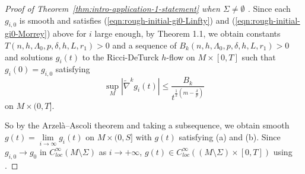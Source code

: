 \documentclass[12pt]{amsart}
\newcommand{\hdel}{\tilde{\nabla}}
\theoremstyle{remark}
\numberwithin{equation}{section}
\begin{document}
\begin{proof}[Proof of Theorem~\ref{thm:intro-application-1-statement} when $\Sigma\neq \emptyset$ ]
    Since each $g_{i,0}$ is smooth and satisfies (\ref{eqn:rough-initial-gi0-Linfty}) and (\ref{eqn:rough-initial-gi0-Morrey}) above for $i$ large enough, by Theorem 1.1, we obtain constants $T(n,h,\Lambda_0,p,\delta,h,L,r_1) > 0$ and a sequence of $B_k(n,h,\Lambda_0,p,\delta,h,L,r_1) > 0$ and solutions $g_i(t)$ to the Ricci-DeTurck $h$-flow on $M \times [0,T]$ such that $g_i(0) = g_{i,0}$ satisfying
$$\sup\limits_{M}|\hdel^k g_i(t)| \leq \frac{B_k}{t^{\frac{1}{2}(m-\frac{\delta}{p})}}$$ on $M \times (0,T]$.


So by the Arzel\`a--Ascoli theorem and taking a subsequence, we obtain smooth $g(t) = \lim\limits_{i\to\infty}g_i(t)$ on $M \times (0,S]$ with $g(t)$ satisfying (a) and (b). Since $g_{i,0}\to g_0$ in $C^\infty_{loc}(M\setminus \Sigma)$ as $i\to+\infty$, $g(t)\in C^\infty_{loc}\left((M\setminus \Sigma)\times [0,T]\right)$ using \cite[Proposition 2.2]{chu_ricci-deturck_2022}. 

\end{proof}
\end{document}
